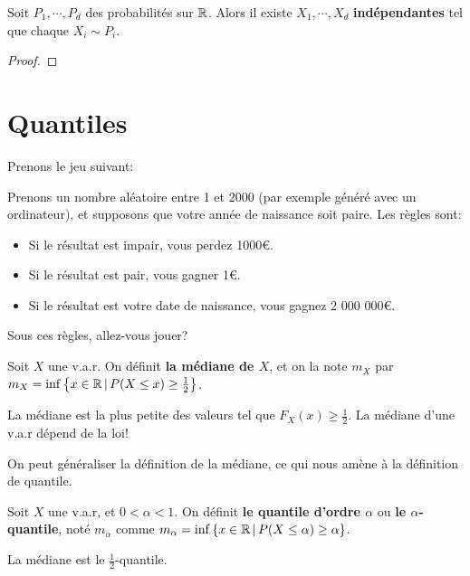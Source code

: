 \begin{proposition}
	Soit $P_{1}, \cdots, P_{d}$ des probabilités sur $\mathbb{R}$. Alors il existe
	$X_{1}, \cdots, X_{d}$ \textbf{indépendantes} tel que chaque $X_{i} \sim
	P_{i}$.
\end{proposition}

\begin{proof}

\end{proof}

\section{Quantiles}

Prenons le jeu suivant:

Prenons un nombre aléatoire entre 1 et 2000 (par exemple généré avec un
ordinateur), et supposons que votre année de naissance soit paire.
Les règles sont:

\begin{itemize}
	\item Si le résultat est impair, vous perdez 1000€.
	\item Si le résultat est pair, vous gagner 1€.
	\item Si le résultat est votre date de naissance, vous gagnez 2 000 000€.
\end{itemize}
Sous ces règles, allez-vous jouer?

\begin{definition}
	Soit $X$ une v.a.r. On définit \textbf{la médiane de $X$}, et on la note
	$m_{X}$ par $m_{X} = \inf\left\{ x \in \mathbb{R} \, | \, P(X \leq x) \geq
		\frac{1}{2} \right\}$.
\end{definition}

La médiane est la plus petite des valeurs tel que $F_{X}(x) \geq \frac{1}{2}$.
La médiane d'une v.a.r dépend de la loi!

On peut généraliser la définition de la médiane, ce qui nous amène à la
définition de quantile.

\begin{definition}
	Soit $X$ une v.a.r, et $0 < \alpha < 1$. On définit \textbf{le quantile
	d'ordre $\alpha$} ou \textbf{le $\alpha$-quantile}, noté $m_{\alpha}$ comme
	$m_{\alpha} = \inf\left\{ x \in \mathbb{R} \, | \, P(X \leq \alpha) \geq \alpha
	\right\}$.
\end{definition}

La médiane est le $\frac{1}{2}$-quantile.
